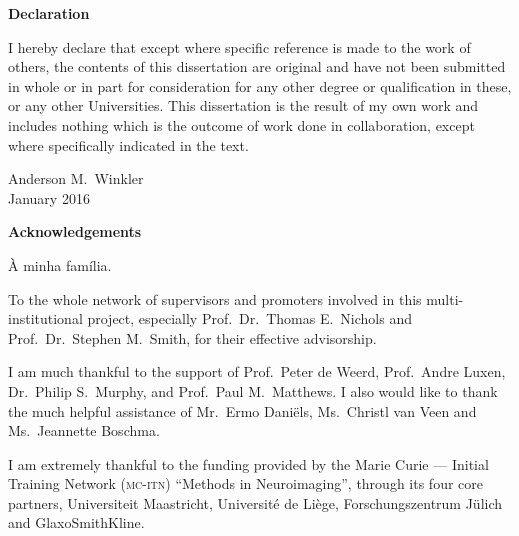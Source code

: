 \cleardoublepage
\newpage
{}
\vspace*{\fill}
\begin{center}
\begin{Large}
\textbf{Declaration}
\end{Large}
\end{center}

\noindent
I hereby declare that except where specific reference is made to the work of others, the contents of this dissertation are original and have not been submitted in whole or in part for consideration for any other degree or qualification in these, or any other Universities. This dissertation is the result of my own work and includes nothing which is the outcome of work done in collaboration, except where specifically indicated in the text.

\begin{flushright}
Anderson M.\ Winkler\\
January 2016
\end{flushright}

\vspace*{\fill}

\cleardoublepage
\newpage
{}
\vspace*{\fill}
\begin{center}
\begin{Large}
\textbf{Acknowledgements}
\end{Large}
\end{center}

\noindent
\`{A} minha fam\'{i}lia.

\vspace{3mm}

\noindent
To the whole network of supervisors and promoters involved in this multi-insti\-tu\-tional project, especially Prof.\ Dr.\ Thomas E.\ Nichols and Prof.\ Dr.\ Stephen M.\ Smith, for their effective advisorship.

\vspace{3mm}

\noindent
I am much thankful to the support of Prof.\ Peter de Weerd, Prof.\ Andre Luxen, Dr.\ Philip S.\ Murphy, and Prof.\ Paul M.\ Matthews. I also would like to thank the much helpful assistance of Mr.\ Ermo Dani\"{e}ls, Ms.\ Christl van Veen and Ms.\ Jeannette Boschma.

\vspace{3mm}

\noindent
I am extremely thankful to the funding provided by the Marie Curie --- Initial Training Network (\textsc{mc-itn}) ``Methods in Neuroimaging'', through its four core partners, Universiteit Maastricht, Universit\'{e} de Li\`{e}ge, Forschungszentrum J\"{u}lich and GlaxoSmithKline.

